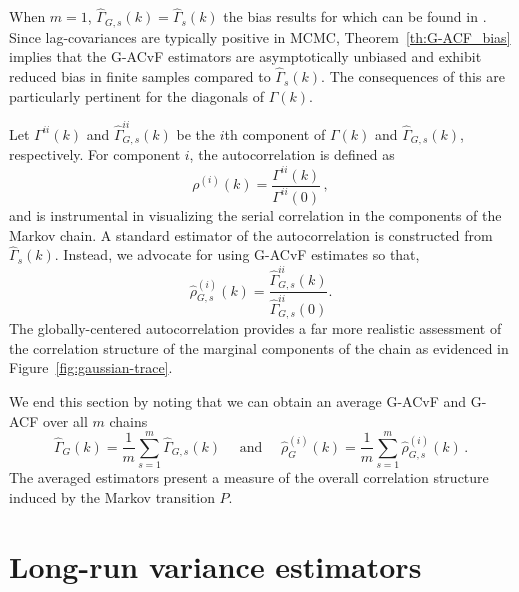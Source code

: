 \documentclass[11pt]{article}
\theoremstyle{remark}
\begin{document}
When $m = 1$, $\hat{\Gamma}_{G,s}(k) = \hat{\Gamma}_{s}(k)
$ the bias results for which can be found in \cite{priestley1981spectral}. Since lag-covariances are typically positive in MCMC, Theorem~\ref{th:G-ACF_bias} implies that the G-ACvF estimators are asymptotically unbiased and exhibit reduced bias in finite samples compared to $\hat{\Gamma}_s(k)$. The consequences of this are particularly pertinent for the diagonals of $\Gamma(k)$.

Let $\Gamma^{ii}(k)$ and $\hat{\Gamma}_{G,s}^{ii}(k)$ be the $i${th} component of $\Gamma(k)$ and $\hat{\Gamma}_{G,s}(k)$, respectively. For component $i$, the autocorrelation is defined as
\[
\rho^{(i)}(k) = \dfrac{\Gamma^{ii}(k)}{\Gamma^{ii}(0)}\,,
\]
and is instrumental in visualizing the serial correlation in the components of the Markov chain. A standard estimator of the autocorrelation is constructed from $\hat{\Gamma}_s(k)$. Instead, we advocate for using G-ACvF estimates so that,
\begin{equation}
\label{eq:acf}
 \hat{\rho}_{G,s}^{(i)}(k) = \dfrac{ \hat{\Gamma}^{ii}_{G,s} (k)}{\hat{\Gamma}^{ii}_{G,s} (0)}. 
\end{equation}
The globally-centered autocorrelation provides a far more realistic assessment of the correlation structure of the marginal components of the chain  as evidenced in Figure~\ref{fig:gaussian-trace}.

We end this section by noting that we can obtain an average G-ACvF and G-ACF over all $m$ chains
\[
\hat{\Gamma}_G(k) = \dfrac{1}{m}\sum_{s=1}^m \hat{\Gamma}_{G,s}(k) \quad \text{ and } \quad \hat{\rho}^{(i)}_G(k) = \dfrac{1}{m}\sum_{s=1}^m \hat{\rho}^{(i)}_{G,s}(k)\,.
\]
The averaged estimators present a measure of the overall correlation structure induced by the Markov transition $P$. 

\section{Long-run variance estimators} \label{sec:variance_est}
\end{document}
